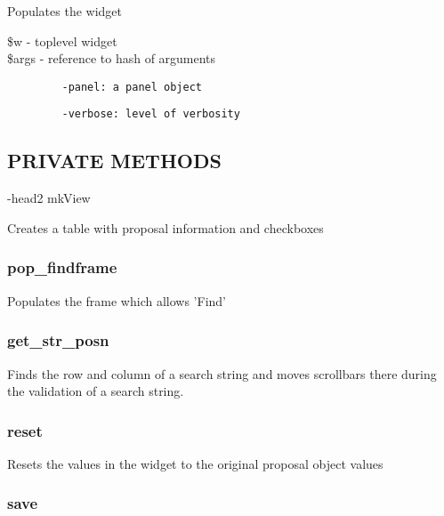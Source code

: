 \documentclass{article}
\begin{document}
Populates the widget

\begin{description}

\item[{\$w - toplevel widget}] \mbox{}
\item[{\$args - reference to hash of arguments}] \mbox{}\begin{verbatim}
   -panel: a panel object
\end{verbatim}
\begin{verbatim}
   -verbose: level of verbosity
\end{verbatim}
\end{description}
\subsection*{PRIVATE METHODS\label{Resurrect_PRIVATE_METHODS}}


-head2 mkView



Creates a table with proposal information and checkboxes

\subsubsection*{pop\_findframe\label{Resurrect_pop_findframe}}


Populates the frame which allows 'Find'

\subsubsection*{get\_str\_posn\label{Resurrect_get_str_posn}}


Finds the row and column of a search string and moves scrollbars there
during the validation of a search string.

\subsubsection*{reset\label{Resurrect_reset}}


Resets the values in the widget to the original proposal object values

\subsubsection*{save\label{Resurrect_save}}
\end{document}
